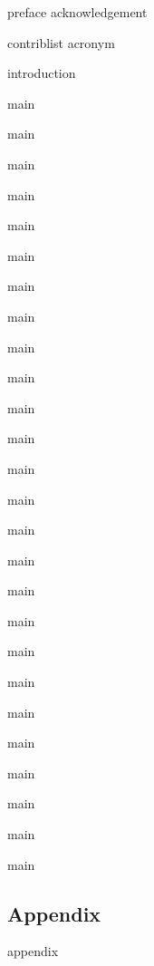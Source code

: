 \documentclass[graybox, envcountchap, tocaftauthskip, 12pt]{svmult}
\newcommand{\segimport}[2]{\begin{refsegment}{#2}\end{refsegment}}
\begin{document}
\frontmatter%

{preface}
{acknowledgement}

\setcounter{tocdepth}{1}
\tableofcontents

{contriblist}
{acronym}

\mainmatter%

\segimport{editor/}{introduction}

{main}
\segimport{Hazard/Earthquake_Ground_Shaking/}{main}
\segimport{Hazard/Earthquake_Surface_Rupture/}{main}
\segimport{Hazard/Earthquake_Liquefaction/}{main}
\segimport{Hazard/Earthquake_Landslide/}{main}
\segimport{Hazard/Storm_Wind/}{main}
\segimport{Hazard/Storm_Surge/}{main}
\segimport{Hazard/Tsunami/}{main}

{main}
\segimport{Response/Structural/}{main}
\segimport{Response/Geotechnical/}{main}
\segimport{Response/CFD_Wind/}{main}
\segimport{Response/CFD_Water/}{main}

{main}
\segimport{Performance/Buildings/}{main}
\segimport{Performance/Transportation/}{main}
\segimport{Performance/Pipelines/}{main}
\segimport{Performance/Power/}{main}

{main}
\segimport{Recovery/Communities/}{main}
\segimport{Recovery/Infrastructure_Systems/}{main}
\segimport{Recovery/Housing/}{main}
\segimport{Recovery/Businesses/}{main}

{main}
\segimport{CrossCutting/Uncertainty/}{main}
\segimport{CrossCutting/AI/}{main}


\backmatter%

\begin{partbacktext}
\part{Appendix}
\appendix
\segimport{editor/}{appendix}
\end{partbacktext}



\printindex

\end{document}
